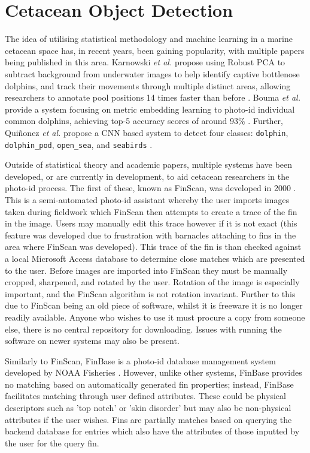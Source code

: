 \section{Cetacean Object Detection}\label{ch:Background,sec:cetaceanDetection}

The idea of utilising statistical methodology and machine learning in a marine cetacean space has, in recent years, been gaining popularity, with multiple papers being published in this area. Karnowski \textit{et al.} propose using Robust PCA to subtract background from underwater images to help identify captive bottlenose dolphins, and track their movements through multiple distinct areas, allowing researchers to annotate pool positions 14 times faster than before \cite{karnowski_dolphin_2015}. Bouma \textit{et al.} provide a system focusing on metric embedding learning to photo-id individual common dolphins, achieving top-5 accuracy scores of around 93\% \cite{bouma_individual_2018}. Further, Qui\~{n}onez \textit{et al.} propose a CNN based system to detect four classes: \texttt{dolphin}, \texttt{dolphin\_pod}, \texttt{open\_sea}, and \texttt{seabirds} \cite{quinonez_using_2019}. 

Outside of statistical theory and academic papers, multiple systems have been developed, or are currently in development, to aid cetacean researchers in the photo-id process. The first of these, known as FinScan, was developed in 2000 \cite{hillman_finscan_2002}. This is a semi-automated photo-id assistant whereby the user imports images taken during fieldwork which FinScan then attempts to create a trace of the fin in the image. Users may manually edit this trace however if it is not exact (this feature was developed due to frustration with barnacles attaching to fins in the area where FinScan was developed). This trace of the fin is than checked against a local Microsoft Access database to determine close matches which are presented to the user. Before images are imported into FinScan they must be manually cropped, sharpened, and rotated by the user. Rotation of the image is especially important, and the FinScan algorithm is not rotation invariant. Further to this due to FinScan being an old piece of software, whilst it is freeware it is no longer readily available. Anyone who wishes to use it must procure a copy from someone else, there is no central repository for downloading. Issues with running the software on newer systems may also be present.

Similarly to FinScan, FinBase is a photo-id database management system developed by NOAA Fisheries \cite{fisheries_finbase_2018}. However, unlike other systems, FinBase provides no matching based on automatically generated fin properties; instead, FinBase facilitates matching through user defined attributes. These could be physical descriptors such as 'top notch' or 'skin disorder' but may also be non-physical attributes if the user wishes. Fins are partially matches based on querying the backend database for entries which also have the attributes of those inputted by the user for the query fin. 

